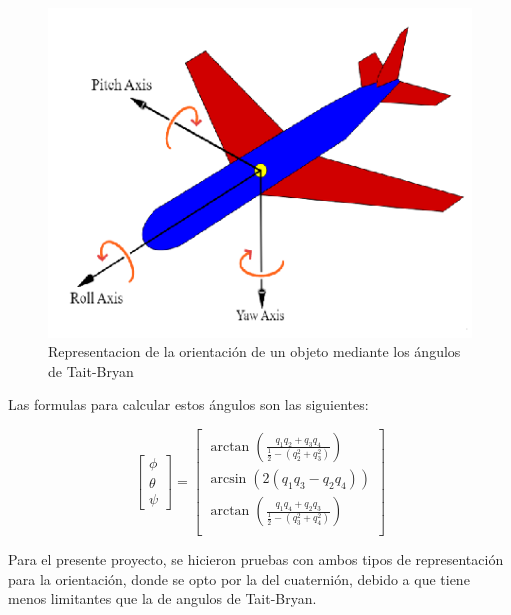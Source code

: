 \documentclass[conference]{IEEEtran}
\begin{document}
    \begin{figure}[htp!]
        \centering
             \includegraphics[width=\columnwidth]{tait-bryan_axis_representation.png}
              \caption{Representacion de la orientación de un objeto mediante los ángulos de Tait-Bryan}
    \end{figure}
    \FloatBarrier 

    Las formulas para calcular estos ángulos son las siguientes:

    \begin{equation}
        \begin{bmatrix}
            \phi \\ \theta \\ \psi 
        \end{bmatrix} =
            \begin{bmatrix}
                \arctan \left (\frac{q_1q_2 + q_3q_4}{\frac{1}{2}-(q^2_2+q^2_3)} \right ) \\
                \arcsin  (2(q_1q_3-q_2q_4)) \\
                \arctan \left (\frac{q_1q_4 + q_2q_3}{\frac{1}{2}-(q^2_3+q^2_4)} \right ) \\
            \end{bmatrix}
    \end{equation}

    Para el presente proyecto, se hicieron pruebas con ambos tipos de representación para la orientación, 
    donde se opto por la del cuaternión, debido a que tiene menos limitantes que la de angulos de Tait-Bryan.
\end{document}
